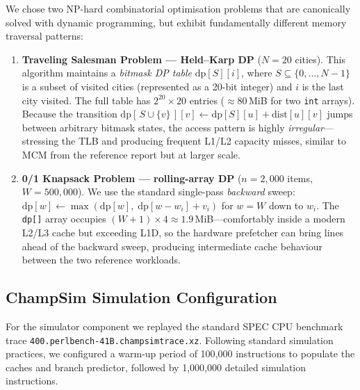 \documentclass[11pt,a4paper]{article}
\begin{document}
We chose two NP-hard combinatorial optimisation problems that are canonically
solved with dynamic programming, but exhibit fundamentally different memory
traversal patterns:

\begin{enumerate}[leftmargin=*]

    \item \textbf{Traveling Salesman Problem — Held--Karp DP}
          ($N = 20$ cities).
          This algorithm maintains a \emph{bitmask DP table}
          $\mathrm{dp}[S][i]$, where $S \subseteq \{0,\ldots,N-1\}$ is a
          subset of visited cities (represented as a 20-bit integer) and $i$
          is the last city visited.  The full table has $2^{20} \times 20$
          entries (${\approx}80$\,MiB for two \texttt{int} arrays).
          Because the transition
          $\mathrm{dp}[\,S\cup\{v\}\,][v] \leftarrow \mathrm{dp}[S][u] +
          \mathrm{dist}[u][v]$
          jumps between arbitrary bitmask states, the access pattern is
          highly \emph{irregular}—stressing the TLB and producing frequent
          L1/L2 capacity misses, similar to MCM from the reference report
          but at larger scale.

    \item \textbf{0/1 Knapsack Problem — rolling-array DP}
          ($n = 2{,}000$ items, $W = 500{,}000$).
          We use the standard single-pass \emph{backward} sweep:
          $\mathrm{dp}[w] \leftarrow \max(\mathrm{dp}[w],\;
          \mathrm{dp}[w - w_i] + v_i)$ for $w = W$ down to $w_i$.
          The \texttt{dp[]} array occupies
          $(W+1) \times 4 \approx 1.9$\,MiB—comfortably inside a modern
          L2/L3 cache but exceeding L1D, so the hardware prefetcher can
          bring lines ahead of the backward sweep, producing intermediate
          cache behaviour between the two reference workloads.
\end{enumerate}

\subsection{ChampSim Simulation Configuration}

For the simulator component we replayed the standard SPEC CPU benchmark trace
\texttt{400.perlbench-41B.champsimtrace.xz}.  Following standard simulation
practices, we configured a warm-up period of 100{,}000 instructions to
populate the caches and branch predictor, followed by 1{,}000{,}000 detailed
simulation instructions.
\end{document}
